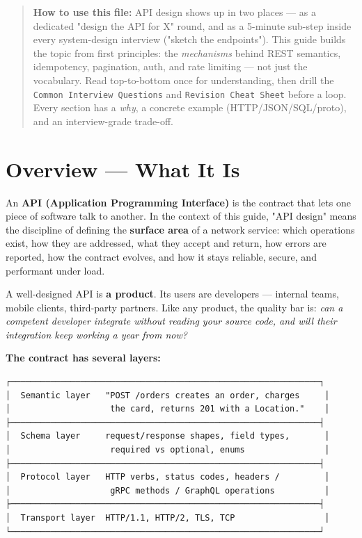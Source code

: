 \documentclass[11pt]{article}
\begin{document}
\makecoverpage

\thispagestyle{empty}
{\hypersetup{hidelinks}\tableofcontents}
\clearpage

\begin{quote}
\textbf{How to use this file:} API design shows up in two places --- as a dedicated "design the API for X" round, and as a 5-minute sub-step inside every system-design interview ("sketch the endpoints"). This guide builds the topic from first principles: the \emph{mechanisms} behind REST semantics, idempotency, pagination, auth, and rate limiting --- not just the vocabulary. Read top-to-bottom once for understanding, then drill the \texttt{Common\ Interview\ Questions} and \texttt{Revision\ Cheat\ Sheet} before a loop. Every section has a \emph{why}, a concrete example (HTTP/JSON/SQL/proto), and an interview-grade trade-off.
\end{quote}

\section{Overview --- What It Is}\label{overview--what-it-is}

An \textbf{API (Application Programming Interface)} is the contract that lets one piece of software talk to another. In the context of this guide, "API design" means the discipline of defining the \textbf{surface area} of a network service: which operations exist, how they are addressed, what they accept and return, how errors are reported, how the contract evolves, and how it stays reliable, secure, and performant under load.

A well-designed API is \textbf{a product}. Its users are developers --- internal teams, mobile clients, third-party partners. Like any product, the quality bar is: \emph{can a competent developer integrate without reading your source code, and will their integration keep working a year from now?}

\textbf{The contract has several layers:}

\setcodelang{}

\begin{verbatim}
┌──────────────────────────────────────────────────────────────┐
│  Semantic layer   "POST /orders creates an order, charges     │
│                    the card, returns 201 with a Location."    │
├──────────────────────────────────────────────────────────────┤
│  Schema layer     request/response shapes, field types,       │
│                    required vs optional, enums                │
├──────────────────────────────────────────────────────────────┤
│  Protocol layer   HTTP verbs, status codes, headers /         │
│                    gRPC methods / GraphQL operations          │
├──────────────────────────────────────────────────────────────┤
│  Transport layer  HTTP/1.1, HTTP/2, TLS, TCP                  │
└──────────────────────────────────────────────────────────────┘
\end{verbatim}
\end{document}
